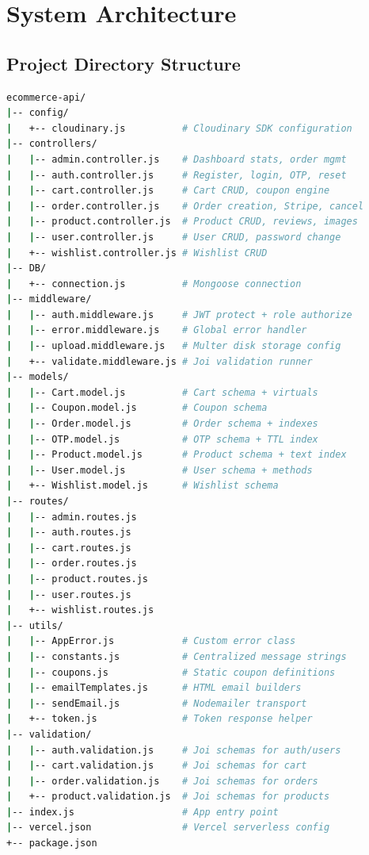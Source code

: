 \chapter{System Architecture}

\section{Project Directory Structure}

\begin{lstlisting}[language=bash,title=Project Tree]
ecommerce-api/
|-- config/
|   +-- cloudinary.js          # Cloudinary SDK configuration
|-- controllers/
|   |-- admin.controller.js    # Dashboard stats, order mgmt
|   |-- auth.controller.js     # Register, login, OTP, reset
|   |-- cart.controller.js     # Cart CRUD, coupon engine
|   |-- order.controller.js    # Order creation, Stripe, cancel
|   |-- product.controller.js  # Product CRUD, reviews, images
|   |-- user.controller.js     # User CRUD, password change
|   +-- wishlist.controller.js # Wishlist CRUD
|-- DB/
|   +-- connection.js          # Mongoose connection
|-- middleware/
|   |-- auth.middleware.js     # JWT protect + role authorize
|   |-- error.middleware.js    # Global error handler
|   |-- upload.middleware.js   # Multer disk storage config
|   +-- validate.middleware.js # Joi validation runner
|-- models/
|   |-- Cart.model.js          # Cart schema + virtuals
|   |-- Coupon.model.js        # Coupon schema
|   |-- Order.model.js         # Order schema + indexes
|   |-- OTP.model.js           # OTP schema + TTL index
|   |-- Product.model.js       # Product schema + text index
|   |-- User.model.js          # User schema + methods
|   +-- Wishlist.model.js      # Wishlist schema
|-- routes/
|   |-- admin.routes.js
|   |-- auth.routes.js
|   |-- cart.routes.js
|   |-- order.routes.js
|   |-- product.routes.js
|   |-- user.routes.js
|   +-- wishlist.routes.js
|-- utils/
|   |-- AppError.js            # Custom error class
|   |-- constants.js           # Centralized message strings
|   |-- coupons.js             # Static coupon definitions
|   |-- emailTemplates.js      # HTML email builders
|   |-- sendEmail.js           # Nodemailer transport
|   +-- token.js               # Token response helper
|-- validation/
|   |-- auth.validation.js     # Joi schemas for auth/users
|   |-- cart.validation.js     # Joi schemas for cart
|   |-- order.validation.js    # Joi schemas for orders
|   +-- product.validation.js  # Joi schemas for products
|-- index.js                   # App entry point
|-- vercel.json                # Vercel serverless config
+-- package.json
\end{lstlisting}

